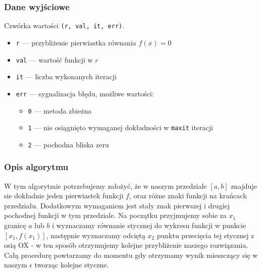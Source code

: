 \documentclass{article}
\begin{document}
\subsubsection*{Dane wyjściowe}
	Czwórka wartości \texttt{(r, val, it, err)}.
	\begin{itemize}
	    \item \texttt{r} — przybliżenie pierwiastka równania $f(x) = 0$
	    \item \texttt{val} — wartość funkcji w $r$
	    \item \texttt{it} — liczba wykonanych iteracji
	    \item \texttt{err} — sygnalizacja błędu, możliwe wartości:
	    \begin{itemize}
	        \item \texttt{0} — metoda zbieżna
	        \item \texttt{1} — nie osiągnięto wymaganej dokładności w \texttt{maxit} iteracji
	        \item \texttt{2} — pochodna bliska zeru
	    \end{itemize}
	\end{itemize}
\subsubsection*{Opis algorytmu}
	W tym algorytmie potrzebujemy założyć, że w naszym przedziale $[a, b]$ znajduje sie dokładnie jeden pierwiastek funkcji $f$, oraz różne znaki funkcji na krańcach przedziału. Dodatkowym wymaganiem jest stały znak pierwszej i drugiej pochodnej funkcji w tym przedziale.
	Na początku przyjmujemy sobie za $x_1$ granicę $a$ lub $b$ i wyznaczamy równanie stycznej do wykresu funkcji w punkcie $[x_1, f(x_1)]$, następnie wyznaczamy odciętą $x_2$ punktu przecięcia tej stycznej z osią OX - w ten sposób otrzymujemy kolejne przybliżenie naszego rozwiązania.\tabularnewline
	Całą procedurę powtarzamy do momentu gdy otrzymamy wynik mieszczący się w naszym $\epsilon$ tworząc kolejne styczne.
\end{document}
